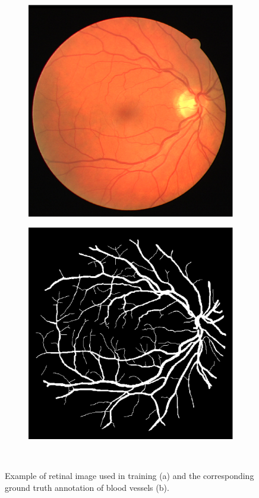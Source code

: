 \documentclass[aps,prb,10pt,twocolumn,groupedaddress]{revtex4-1}
\begin{document}
\begin{figure}[!t]
	\centering
	\begin{subfigure}[]{0.4\textwidth}
		\centering
		\includegraphics[width=\textwidth]{images/02_training.eps}
		\caption{}
	\end{subfigure}
	\hspace{1cm}
	\centering
	\begin{subfigure}[]{0.4\textwidth}
		\centering
		\includegraphics[width=\textwidth]{images/02_manual1.eps}
		\caption{}
	\end{subfigure}\\
	\caption{Example of retinal image used in training (a) and the corresponding ground truth annotation of blood vessels (b).}
	\label{fig:example_images}
\end{figure}
\end{document}
